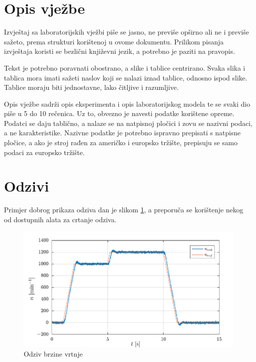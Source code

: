 \documentclass{izvjestaj}
\begin{document}
\maketitle

\section{Opis vježbe}

Izvještaj sa laboratorijskih vježbi piše se jasno, ne previše opširno ali ne i previše sažeto, prema strukturi korištenoj u ovome dokumentu. Prilikom pisanja izvještaja koristi se bezlični književni jezik, a potrebno je paziti na pravopis. 

Tekst je potrebno poravnati obostrano, a slike i tablice centrirano. Svaka slika i tablica mora imati sažeti naslov koji se nalazi iznad tablice, odnosno ispod slike. Tablice moraju biti jednostavne, lako čitljive i razumljive.

Opis vježbe sadrži opis eksperimenta i opis laboratorijskog modela te se svaki dio piše u 5 do 10 rečenica. Uz to, obvezno je navesti podatke korištene opreme. Podatci se daju tablično, a nalaze se na natpisnoj pločici i zovu se nazivni podaci, a ne karakteristike. Nazivne podatke je potrebno ispravno prepisati s natpisne pločice, a ako je stroj rađen za američko i europsko tržište, prepisuju se samo podaci za europsko tržište.

\section{Odzivi}

Primjer dobrog prikaza odziva dan je slikom  \ref{fig:slika}, a preporuča se korištenje nekog od dostupnih alata za crtanje odziva.

	\begin{figure}[!htb]
	\centering
	\includegraphics{slika.pdf}
	\caption{Odziv brzine vrtnje}
	\label{fig:slika}
	\end{figure} 
\end{document}
